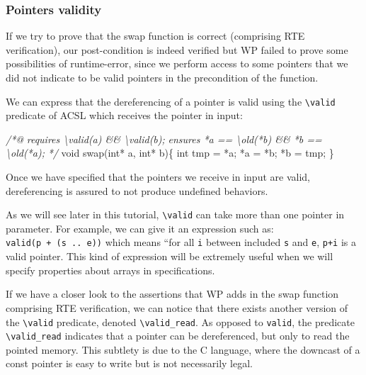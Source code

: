\documentclass[12pt,francais,]{scrbook}
\newenvironment{Shaded}{}{}
\newcommand{\DataTypeTok}[1]{\textcolor[rgb]{0.56,0.13,0.00}{{#1}}}
\newcommand{\CommentTok}[1]{\textcolor[rgb]{0.38,0.63,0.69}{\textit{{#1}}}}
\newcommand{\NormalTok}[1]{{#1}}
\begin{document}
\subsubsection{Pointers validity}\label{pointers-validity}

If we try to prove that the swap function is correct (comprising RTE
verification), our post-condition is indeed verified but WP failed to
prove some possibilities of runtime-error, since we perform access to
some pointers that we did not indicate to be valid pointers in the
precondition of the function.

We can express that the dereferencing of a pointer is valid using the
\texttt{\textbackslash{}valid} predicate of ACSL which receives the
pointer in input:

\begin{footnotesize}\begin{Shaded}
\begin{Highlighting}[]
\CommentTok{/*@}
\CommentTok{  requires \textbackslash{}valid(a) && \textbackslash{}valid(b);}
\CommentTok{  ensures  *a == \textbackslash{}old(*b) && *b == \textbackslash{}old(*a);}
\CommentTok{*/}
\DataTypeTok{void} \NormalTok{swap(}\DataTypeTok{int}\NormalTok{* a, }\DataTypeTok{int}\NormalTok{* b)\{}
  \DataTypeTok{int} \NormalTok{tmp = *a;}
  \NormalTok{*a = *b;}
  \NormalTok{*b = tmp;}
\NormalTok{\}}
\end{Highlighting}
\end{Shaded}\end{footnotesize}

Once we have specified that the pointers we receive in input are valid,
dereferencing is assured to not produce undefined behaviors.

As we will see later in this tutorial, \texttt{\textbackslash{}valid}
can take more than one pointer in parameter. For example, we can give it
an expression such as: \texttt{valid(p\ +\ (s\ ..\ e))} which means
``for all \texttt{i} between included \texttt{s} and \texttt{e},
\texttt{p+i} is a valid pointer. This kind of expression will be
extremely useful when we will specify properties about arrays in
specifications.

If we have a closer look to the assertions that WP adds in the swap
function comprising RTE verification, we can notice that there exists
another version of the \texttt{\textbackslash{}valid} predicate, denoted
\texttt{\textbackslash{}valid\_read}. As opposed to \texttt{valid}, the
predicate \texttt{\textbackslash{}valid\_read} indicates that a pointer
can be dereferenced, but only to read the pointed memory. This subtlety
is due to the C language, where the downcast of a const pointer is easy
to write but is not necessarily legal.
\end{document}
